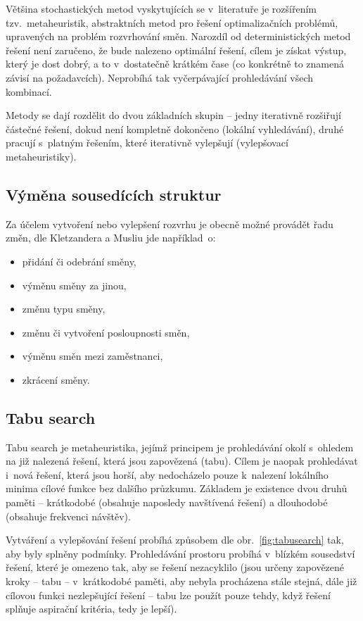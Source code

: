 \documentclass[a4paper,11pt,openany,twoside]{book}
\begin{document}
Většina stochastických metod vyskytujících se v~literatuře je rozšířením tzv.~metaheuristik, abstraktních metod pro řešení optimalizačních problémů, upravených na problém rozvrhování směn. Narozdíl od deterministických metod řešení není zaručeno, že bude nalezeno optimální řešení, cílem je získat výstup, který je dost dobrý, a to v~dostatečně krátkém čase (co konkrétně to znamená závisí na požadavcích). Neprobíhá tak vyčerpávající prohledávání všech kombinací. \cite{glover2015metaheuristics}

Metody se dají rozdělit do dvou základních skupin -- jedny iterativně rozšiřují částečné řešení, dokud není kompletně dokončeno (lokální vyhledávání), druhé pracují s~platným řešením, které iterativně vylepšují (vylepšovací metaheuristiky). \cite{van2013personnel}

\subsection*{Výměna sousedících struktur}
Za účelem vytvoření nebo vylepšení rozvrhu je obecně možné provádět řadu změn, dle Kletzandera a Musliu \cite{kletzander2020solving} jde například~o:
\begin{itemize}
	\item přidání či odebrání směny,
	\item výměnu směny za jinou,
	\item změnu typu směny,
	\item změnu či vytvoření posloupnosti směn,
	\item výměnu směn mezi zaměstnanci,
	\item zkrácení směny.
\end{itemize}


\subsection{Tabu search}
Tabu search je metaheuristika, jejímž principem je prohledávání okolí s~ohledem na již nalezená řešení, která jsou zapovězená (tabu). Cílem je naopak prohledávat i~nová řešení, která jsou horší, aby nedocházelo pouze k~nalezení lokálního minima cílové funkce bez dalšího průzkumu. Základem je existence dvou druhů paměti – krátkodobé (obsahuje naposledy navštívená řešení) a dlouhodobé (obsahuje frekvenci návštěv). \cite{liang2020optimization}

Vytváření a vylepšování řešení probíhá způsobem dle obr.~\ref{fig:tabusearch} tak, aby byly splněny podmínky. Prohledávání prostoru probíhá v~blízkém sousedství řešení, které je omezeno tak, aby se řešení nezacyklilo (jsou určeny zapovězené kroky -- tabu -- v~krátkodobé paměti, aby nebyla procházena stále stejná, dále již cílovou funkci nezlepšující řešení -- tabu lze použít pouze tehdy, když řešení splňuje aspirační kritéria, tedy je lepší).  \cite{glover1990tabu}
\end{document}
